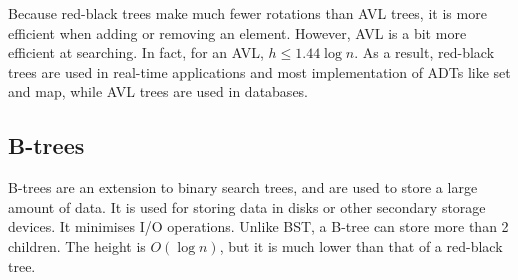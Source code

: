 \documentclass[a4paper, openany]{memoir}
\begin{document}
\noindent Because red-black trees make much fewer rotations than AVL trees, it is more efficient when adding or removing an element. However, AVL is a bit more efficient at searching. In fact, for an AVL, $h \leq 1.44 \log n$. As a result, red-black trees are used in real-time applications and most implementation of ADTs like set and map, while AVL trees are used in databases.

\subsection{B-trees}
B-trees are an extension to binary search trees, and are used to store a large amount of data. It is used for storing data in disks or other secondary storage devices. It minimises I/O operations. Unlike BST, a B-tree can store more than 2 children. The height is $O(\log n)$, but it is much lower than that of a red-black tree.
\end{document}
